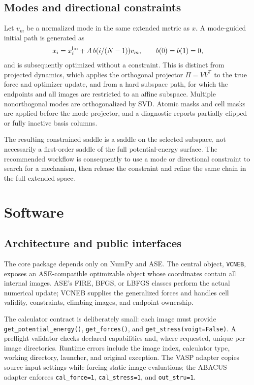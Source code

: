 \documentclass[final,3p,times]{elsarticle}
\begin{document}
\subsection{Modes and directional constraints}

Let $v_m$ be a normalized mode in the same extended metric as $x$.  A
mode-guided initial path is generated as
\begin{equation}
  x_i=x_i^{\rm lin}+A\,b(i/(N-1))v_m,
  \qquad b(0)=b(1)=0,
  \label{eq:guided_path}
\end{equation}
and is subsequently optimized without a constraint.  This is distinct from
projected dynamics, which applies the orthogonal projector
$\Pi=VV^{\mathsf T}$ to the true force and optimizer update, and from a hard
subspace path, for which the endpoints and all images are restricted to an
affine subspace.  Multiple nonorthogonal modes are orthogonalized by SVD.
Atomic masks and cell masks are applied before the mode projector, and a
diagnostic reports partially clipped or fully inactive basis columns.

The resulting constrained saddle is a saddle on the selected subspace, not
necessarily a first-order saddle of the full potential-energy surface.  The
recommended workflow is consequently to use a mode or directional constraint
to search for a mechanism, then release the constraint and refine the same
chain in the full extended space.

\section{Software}
\label{sec:software}

\subsection{Architecture and public interfaces}

The core package depends only on NumPy and ASE.  The central object,
\texttt{VCNEB}, exposes an ASE-compatible optimizable object whose coordinates
contain all internal images.  ASE's FIRE, BFGS, or LBFGS classes perform the
actual numerical update; VCNEB supplies the generalized forces and handles
cell validity, constraints, climbing images, and endpoint ownership.

The calculator contract is deliberately small: each image must provide
\texttt{get\_potential\_energy()}, \texttt{get\_forces()}, and
\texttt{get\_stress(voigt=False)}.  A preflight validator checks declared
capabilities and, where requested, unique per-image directories.  Runtime
errors include the image index, calculator type, working directory, launcher,
and original exception.  The VASP adapter copies source input settings while
forcing static image evaluations; the ABACUS adapter enforces
\texttt{cal\_force=1}, \texttt{cal\_stress=1}, and \texttt{out\_stru=1}.
\end{document}
